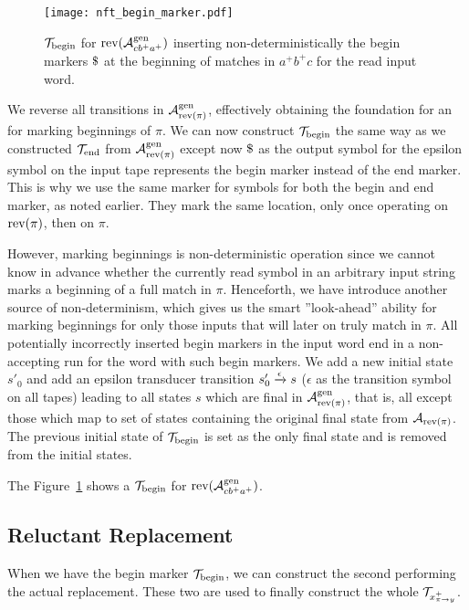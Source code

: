 \begin{figure}
  \centering
  \texttt{[image: nft\_begin\_marker.pdf]}
  \caption{\nft $\mathcal{T}_{\text{begin}}$ for $\text{rev(}\mathcal{A}^{\text{gen}}_{cb^+a^+}\text{)}$ inserting non-deterministically the begin markers $\marker$ at the beginning of matches in $a^+b^+c$ for the read input word.}
  \label{fig:begin_marker_nft}
\end{figure}

We reverse all transitions in $\mathcal{A}^{\text{gen}}_{\text{rev(}\pi\text{)}}$, effectively obtaining the foundation for an \nfa for marking beginnings of $\pi$.
We can now construct $\mathcal{T}_{\text{begin}}$ the same way as we constructed $\mathcal{T}_{\text{end}}$ from $\mathcal{A}^{\text{gen}}_{\text{rev(}\pi\text{)}}$ except now $\marker$ as the output symbol for the epsilon symbol on the input tape represents the begin marker instead of the end marker.
This is why we use the same marker for symbols for both the begin and end marker, as noted earlier.
They mark the same location, only once operating on $\text{rev(}\pi\text{)}$, then on $\pi$.

However, marking beginnings is non-deterministic operation since we cannot know in advance whether the currently read symbol in an arbitrary input string marks a beginning of a full match in $\pi$.
Henceforth, we have introduce another source of non-determinism, which gives us the smart ''look-ahead'' ability for marking beginnings for only those inputs that will later on truly match in $\pi$.
All potentially incorrectly inserted begin markers in the input word end in a non-accepting run for the word with such begin markers.
We add a new initial state $s'_0$ and add an epsilon transducer transition ${s'_0} \xrightarrow{{\epsilon}} {s}$ ($\epsilon$ as the transition symbol on all tapes) leading to all states $s$ which are final in $\mathcal{A}^{\text{gen}}_{\text{rev(}\pi\text{)}}$, that is, all except those which map to set of states containing the original final state from $\mathcal{A}_{\text{rev(}\pi\text{)}}$.
The previous initial state of $\mathcal{T}_{\text{begin}}$ is set as the only final state and is removed from the initial states.

The Figure~\ref{fig:begin_marker_nft} shows a $\mathcal{T}_{\text{begin}}$ for $\text{rev(}\mathcal{A}^{\text{gen}}_{cb^+a^+}\text{)}$.

\subsection{Reluctant Replacement \nft}

When we have the begin marker \nft $\mathcal{T}_{\text{begin}}$, we can construct the second \nft performing the actual replacement.
These two \nfts are used to finally construct the whole $\mathcal{T}_{x^{+}_{\pi \rightarrow y}}$.

